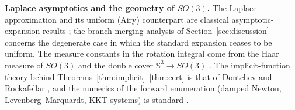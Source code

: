 \textbf{Laplace asymptotics and the geometry of $SO(3)$.} The Laplace approximation and its uniform (Airy) counterpart are classical asymptotic-expansion results \cite{bleistein1986,wong1989}; the branch-merging analysis of Section~\ref{sec:discussion} concerns the degenerate case in which the standard expansion ceases to be uniform. The measure constants in the rotation integral come from the Haar measure of $SO(3)$ and the double cover $\mathbb{S}^3\to SO(3)$ \cite{chirikjian2012}. The implicit-function theory behind Theorems~\ref{thm:implicit}--\ref{thm:cert} is that of Dontchev and Rockafellar \cite{dontchev2009}, and the numerics of the forward enumeration (damped Newton, Levenberg--Marquardt, KKT systems) is standard \cite{nocedal2006}.
